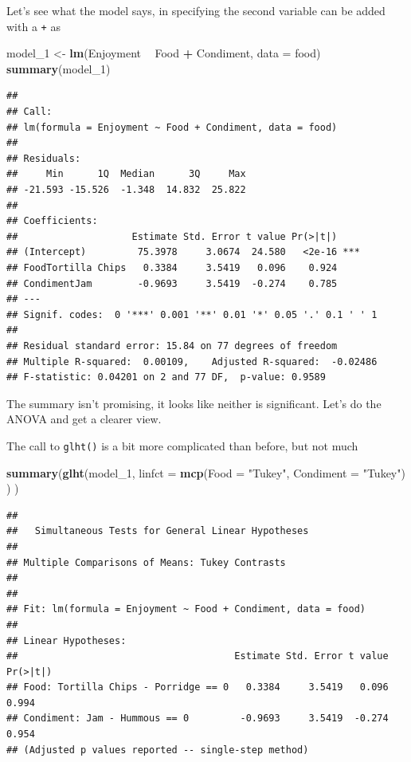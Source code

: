 \documentclass[
]{book}
\newenvironment{Shaded}{\begin{snugshade}}{\end{snugshade}}
\newcommand{\DataTypeTok}[1]{\textcolor[rgb]{0.13,0.29,0.53}{#1}}
\newcommand{\DecValTok}[1]{\textcolor[rgb]{0.00,0.00,0.81}{#1}}
\newcommand{\KeywordTok}[1]{\textcolor[rgb]{0.13,0.29,0.53}{\textbf{#1}}}
\newcommand{\NormalTok}[1]{#1}
\newcommand{\OperatorTok}[1]{\textcolor[rgb]{0.81,0.36,0.00}{\textbf{#1}}}
\newcommand{\StringTok}[1]{\textcolor[rgb]{0.31,0.60,0.02}{#1}}
\begin{document}
Let's see what the model says, in specifying the second variable can be added with a \texttt{+} as

\begin{Shaded}
\begin{Highlighting}[]
\NormalTok{model_}\DecValTok{1}\NormalTok{ <-}\StringTok{ }\KeywordTok{lm}\NormalTok{(Enjoyment }\OperatorTok{~}\StringTok{ }\NormalTok{Food }\OperatorTok{+}\StringTok{ }\NormalTok{Condiment, }\DataTypeTok{data =}\NormalTok{ food)}
\KeywordTok{summary}\NormalTok{(model_}\DecValTok{1}\NormalTok{)}
\end{Highlighting}
\end{Shaded}

\begin{verbatim}
## 
## Call:
## lm(formula = Enjoyment ~ Food + Condiment, data = food)
## 
## Residuals:
##     Min      1Q  Median      3Q     Max 
## -21.593 -15.526  -1.348  14.832  25.822 
## 
## Coefficients:
##                    Estimate Std. Error t value Pr(>|t|)    
## (Intercept)         75.3978     3.0674  24.580   <2e-16 ***
## FoodTortilla Chips   0.3384     3.5419   0.096    0.924    
## CondimentJam        -0.9693     3.5419  -0.274    0.785    
## ---
## Signif. codes:  0 '***' 0.001 '**' 0.01 '*' 0.05 '.' 0.1 ' ' 1
## 
## Residual standard error: 15.84 on 77 degrees of freedom
## Multiple R-squared:  0.00109,	Adjusted R-squared:  -0.02486 
## F-statistic: 0.04201 on 2 and 77 DF,  p-value: 0.9589
\end{verbatim}

The summary isn't promising, it looks like neither is significant. Let's do the ANOVA and get a clearer view.

The call to \texttt{glht()} is a bit more complicated than before, but not much

\begin{Shaded}
\begin{Highlighting}[]
\KeywordTok{summary}\NormalTok{(}\KeywordTok{glht}\NormalTok{(model_}\DecValTok{1}\NormalTok{, }\DataTypeTok{linfct =} \KeywordTok{mcp}\NormalTok{(}\DataTypeTok{Food =} \StringTok{"Tukey"}\NormalTok{, }\DataTypeTok{Condiment =} \StringTok{"Tukey"}\NormalTok{) ) )}
\end{Highlighting}
\end{Shaded}

\begin{verbatim}
## 
## 	 Simultaneous Tests for General Linear Hypotheses
## 
## Multiple Comparisons of Means: Tukey Contrasts
## 
## 
## Fit: lm(formula = Enjoyment ~ Food + Condiment, data = food)
## 
## Linear Hypotheses:
##                                      Estimate Std. Error t value Pr(>|t|)
## Food: Tortilla Chips - Porridge == 0   0.3384     3.5419   0.096    0.994
## Condiment: Jam - Hummous == 0         -0.9693     3.5419  -0.274    0.954
## (Adjusted p values reported -- single-step method)
\end{verbatim}
\end{document}
